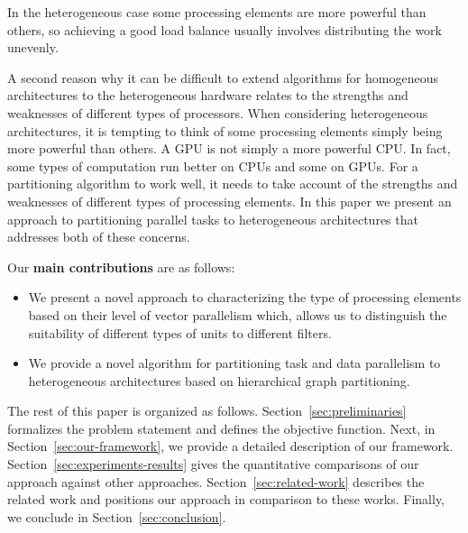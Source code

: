 In the heterogeneous case some processing elements are more powerful
than others, so achieving a good load balance usually involves
distributing the work unevenly.

A second reason why it can be difficult to extend algorithms for
homogeneous architectures to the heterogeneous hardware relates to the
strengths and weaknesses of different types of processors. When
considering heterogeneous architectures, it is tempting to think of
some processing elements simply being more powerful than others.
A GPU is not simply a more powerful CPU. In fact, some types of
computation run better on CPUs and some on GPUs.  For a partitioning
algorithm to work well, it needs to take account of the strengths and
weaknesses of different types of processing elements. In this paper we
present an approach to partitioning parallel tasks to heterogeneous
architectures that addresses both of these concerns.

Our \textbf{main contributions} are as follows:
\begin{itemize}
\item We present a novel approach to characterizing the type of
  processing elements based on their level of vector parallelism which,
  allows us to distinguish the suitability of different types of units
  to different filters.
\item We provide a novel algorithm for partitioning task and data parallelism
  to heterogeneous architectures based on hierarchical graph
  partitioning.
\end{itemize}

The rest of this paper is organized as follows.
Section~\ref{sec:preliminaries} formalizes the problem statement and
defines the objective function. Next, in
Section~\ref{sec:our-framework}, we provide a detailed description of
our framework. Section~\ref{sec:experiments-results} gives the quantitative
comparisons of our approach against other
approaches. Section~\ref{sec:related-work} describes the related work
and positions our approach in comparison to these works.  Finally, we
conclude in Section~\ref{sec:conclusion}.
